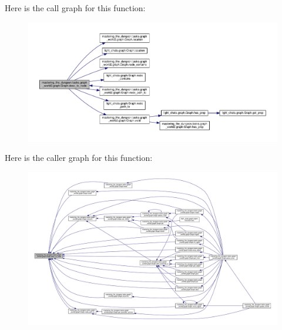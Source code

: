 Here is the call graph for this function\+:
\nopagebreak
\begin{figure}[H]
\begin{center}
\leavevmode
\includegraphics[width=350pt]{classmastering__the__dungeon_1_1tasks_1_1graph__world2_1_1graph_1_1Graph_ad92850262273554e999408b6ba3f2d44_cgraph}
\end{center}
\end{figure}
Here is the caller graph for this function\+:
\nopagebreak
\begin{figure}[H]
\begin{center}
\leavevmode
\includegraphics[width=350pt]{classmastering__the__dungeon_1_1tasks_1_1graph__world2_1_1graph_1_1Graph_ad92850262273554e999408b6ba3f2d44_icgraph}
\end{center}
\end{figure}
\mbox{\label{classmastering__the__dungeon_1_1tasks_1_1graph__world2_1_1graph_1_1Graph_a3c6ce42eda8759a82bba26bd2f4d1822}} 
